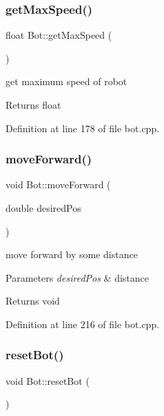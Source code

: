 \subsubsection{\texorpdfstring{get\+Max\+Speed()}{getMaxSpeed()}}
{\footnotesize\ttfamily float Bot\+::get\+Max\+Speed (\begin{DoxyParamCaption}{ }\end{DoxyParamCaption})}



get maximum speed of robot 

\begin{DoxyReturn}{Returns}
float 
\end{DoxyReturn}


Definition at line 178 of file bot.\+cpp.

\mbox{\label{class_bot_abc25556b72a44e45056d161eaa48e1c6}} 
\subsubsection{\texorpdfstring{move\+Forward()}{moveForward()}}
{\footnotesize\ttfamily void Bot\+::move\+Forward (\begin{DoxyParamCaption}\item[{double}]{desired\+Pos }\end{DoxyParamCaption})}



move forward by some distance 


\begin{DoxyParams}{Parameters}
{\em desired\+Pos} & distance \\
\hline
\end{DoxyParams}
\begin{DoxyReturn}{Returns}
void 
\end{DoxyReturn}


Definition at line 216 of file bot.\+cpp.

\mbox{\label{class_bot_aeae87db5fd2d6a130587f665e39a6557}} 
\subsubsection{\texorpdfstring{reset\+Bot()}{resetBot()}}
{\footnotesize\ttfamily void Bot\+::reset\+Bot (\begin{DoxyParamCaption}{ }\end{DoxyParamCaption})}



